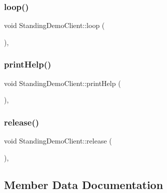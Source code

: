 \subsubsection{\texorpdfstring{loop()}{loop()}}
{\footnotesize\ttfamily void Standing\+Demo\+Client\+::loop (\begin{DoxyParamCaption}{ }\end{DoxyParamCaption})\hspace{0.3cm}{\ttfamily [protected]}, {\ttfamily [virtual]}}

\hypertarget{classStandingDemoClient_ae1f321428f6b67b2f8bf7e1e7a1cd3d4}{}\label{classStandingDemoClient_ae1f321428f6b67b2f8bf7e1e7a1cd3d4} 
\subsubsection{\texorpdfstring{print\+Help()}{printHelp()}}
{\footnotesize\ttfamily void Standing\+Demo\+Client\+::print\+Help (\begin{DoxyParamCaption}{ }\end{DoxyParamCaption})\hspace{0.3cm}{\ttfamily [protected]}, {\ttfamily [virtual]}}

\hypertarget{classStandingDemoClient_abdc4f3642b1ab31ba16375e55a7a68f4}{}\label{classStandingDemoClient_abdc4f3642b1ab31ba16375e55a7a68f4} 
\subsubsection{\texorpdfstring{release()}{release()}}
{\footnotesize\ttfamily void Standing\+Demo\+Client\+::release (\begin{DoxyParamCaption}{ }\end{DoxyParamCaption})\hspace{0.3cm}{\ttfamily [protected]}, {\ttfamily [virtual]}}



\subsection{Member Data Documentation}
\hypertarget{classStandingDemoClient_a223aa634ceba696716779461ec1d3f63}{}\label{classStandingDemoClient_a223aa634ceba696716779461ec1d3f63} 
